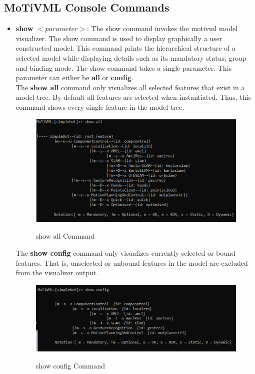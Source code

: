 \documentclass{article}
\begin{document}
\subsection{MoTiVML Console Commands}
\begin{itemize}
	\item \textbf{show $<parameter>$}: The show command invokes the motivml model visualizer. The show command is used to display graphically a user constructed model. This command prints the hierarchical structure of a selected model while displaying details such as its mandatory status, group and binding mode. The show command takes a single parameter. This parameter can either be \textbf{all} or  \textbf{config}. \\
	
	The \textbf{show all} command only visualizes all selected features that exist in a model tree. By default all features are selected when instantiated. Thus, this command shows every single feature in the model tree.
	
	\begin{figure}[H]
		\caption{show all Command}
		\centering
		\includegraphics[width=\columnwidth]{images/showall.png}
		\label{showall}
	\end{figure}

	The \textbf{show config} command only visualizes currently selected or bound features. That is, unselected or unbound features in the model are excluded from the visualizer output.

	\begin{figure}[H]
		\caption{show config Command}
		\centering
		\includegraphics[width=\columnwidth]{images/showconfig.png}
		\label{showconfig}
	\end{figure}
	

\end{itemize}
\end{document}
